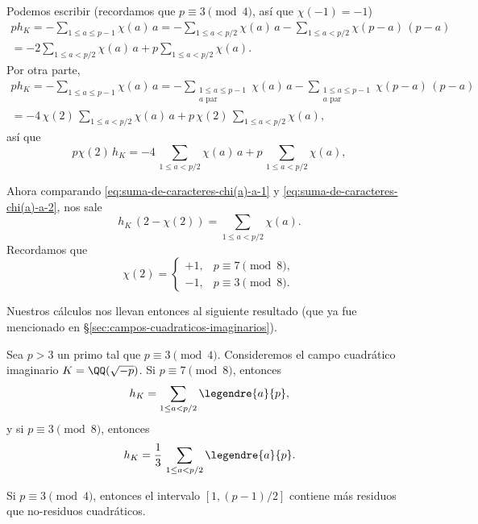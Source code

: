 Podemos escribir (recordamos que $p \equiv 3 \pmod{4}$, así que
$\chi (-1) = -1$)
\begin{multline}
  \label{eq:suma-de-caracteres-chi(a)-a-1}
  p h_K = -\sum_{1 \le a \le p-1} \chi (a)\,a =
  -\sum_{1 \le a < p/2} \chi (a)\,a - \sum_{1 \le a < p/2} \chi (p-a)\,(p-a) \\
  = -2\sum_{1 \le a < p/2} \chi (a)\,a + p\sum_{1 \le a < p/2} \chi (a).
\end{multline}
Por otra parte,
\begin{multline*}
  p h_K = -\sum_{1 \le a \le p-1} \chi (a)\,a =
  -\sum_{\substack{1 \le a \le p-1 \\ a \text{ par}}} \chi (a)\,a - \sum_{\substack{1 \le a \le p-1 \\ a \text{ par}}} \chi (p-a)\,(p-a) \\
= -4\,\chi(2)\,\sum_{1 \le a < p/2} \chi (a)\,a + p\,\chi(2)\,\sum_{1 \le a < p/2} \chi (a),
\end{multline*}
así que
\begin{equation}
  \label{eq:suma-de-caracteres-chi(a)-a-2}
  p\chi(2)\,h_K = -4\,\sum_{1 \le a < p/2} \chi (a)\,a + p\,\sum_{1 \le a < p/2} \chi (a),
\end{equation}

Ahora comparando \eqref{eq:suma-de-caracteres-chi(a)-a-1}
y \eqref{eq:suma-de-caracteres-chi(a)-a-2}, nos sale
$$h_K\,(2 - \chi (2)) = \sum_{1 \le a < p/2} \chi (a).$$
Recordamos que
\[ \chi (2) = \begin{cases}
  +1, & p \equiv 7 \pmod{8},\\
  -1, & p \equiv 3 \pmod{8}.
\end{cases} \]

Nuestros cálculos nos llevan entonces al siguiente resultado
(que ya fue mencionado en \S\ref{sec:campos-cuadraticos-imaginarios}).

\begin{teorema}[Dirichlet]
  Sea $p > 3$ un primo tal que $p \equiv 3 \pmod{4}$. Consideremos el campo
  cuadrático imaginario $K = \QQ (\sqrt{-p})$. Si $p \equiv 7 \pmod{8}$,
  entonces
  $$h_K = \sum_{1 \le a < p/2} \legendre{a}{p},$$
  y si $p \equiv 3 \pmod{8}$, entonces
  $$h_K = \frac{1}{3}\,\sum_{1 \le a < p/2} \legendre{a}{p}.$$
\end{teorema}

\begin{corolario}
  Si $p \equiv 3 \pmod{4}$, entonces el intervalo $[1, (p-1)/2]$ contiene más
  residuos que no-residuos cuadráticos.
\end{corolario}

